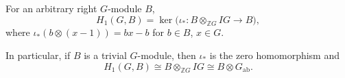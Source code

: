 For an arbitrary right $G$-module $B$,
$$H_1(G, B) = \ker\bigl(\iota_* : B \otimes_{\mathbb{Z}G} IG \to B\bigr),$$
where $\iota_*(b \otimes (x - 1)) = bx - b$ for $b \in B$, $x \in G$.

In particular, if $B$ is a trivial $G$-module, then $\iota_*$ is the zero homomorphism and
$$H_1(G, B) \cong B \otimes_{\mathbb{Z}G} IG \cong B \otimes G_{\mathrm{ab}}.$$
